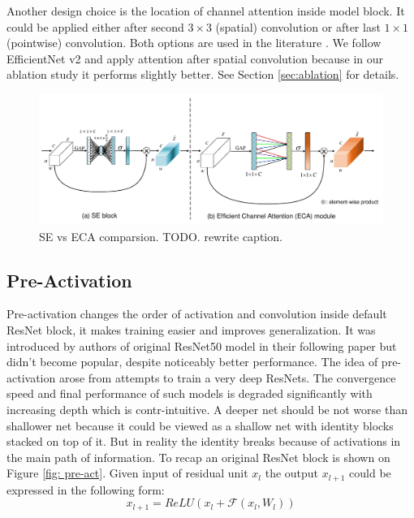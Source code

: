Another design choice is the location of channel attention inside model block. It could be applied either after second $3 \times 3$ (spatial) convolution or after last $1 \times 1 $ (pointwise) convolution. Both options are used in the literature \cite{tan2019_efficientnet} \cite{tan2021_efficientnetv2} \cite{lin2020neural_genet}. We follow EfficientNet v2 \cite{tan2021_efficientnetv2} and apply attention after spatial convolution because in our ablation study it performs slightly better.  See Section \ref{sec:ablation} for details. %


\begin{figure}[h!]
  \caption{SE vs ECA comparsion. TODO. rewrite caption.}
  \label{fig: se-eca}
  \includegraphics[width=1\textwidth]{images/eca_module.png}
\end{figure}


\subsection{Pre-Activation}
Pre-activation changes the order of activation and convolution inside default ResNet block, it makes training easier and improves generalization. It was introduced by authors of original ResNet50 model \cite{he2016deep_resnetv1} in their following paper \cite{he2016identity_resnetv2} but didn't become popular, despite noticeably better performance. 
The idea of pre-activation arose from attempts to train a very deep ResNets. The convergence speed and final performance of such models is degraded significantly with increasing depth which is contr-intuitive. A deeper net should be not worse than shallower net because it could be viewed as a shallow net with identity blocks stacked on top of it. But in reality the identity breaks because of activations in the main path of information. To recap an original ResNet block is shown on Figure \ref{fig: pre-act}. Given input of residual unit $x_l$ the output $x_{l+1}$ could be expressed in the following form: 
$$ x_{l+1} = ReLU \left( x_l + \mathcal{F} (x_l, W_l) \right)$$ \label{eq: res-block}

